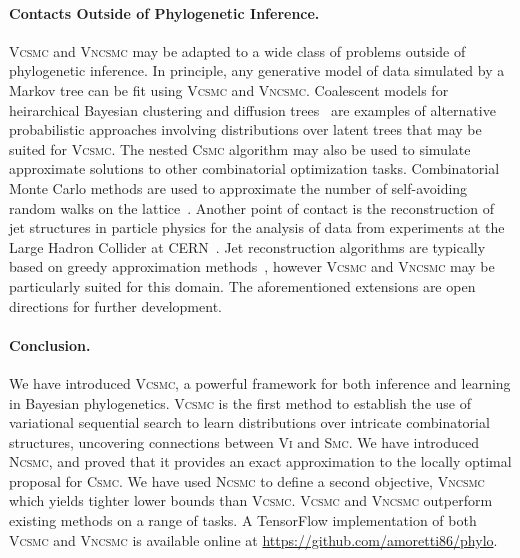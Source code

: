 \documentclass[accepted]{uai2021} %
\theoremstyle{definition}
\begin{document}
\paragraph{Contacts Outside of Phylogenetic Inference.} \textsc{Vcsmc} and \textsc{Vncsmc} may be adapted to a wide class of problems outside of phylogenetic inference. In principle, any generative model of data simulated by a Markov tree can be fit using \textsc{Vcsmc} and \textsc{Vncsmc}. Coalescent models for heirarchical Bayesian clustering and diffusion trees~\citep{teh2009bayesian,NIPS2012_c73dfe6c,10.1214/10-AOAS435} are examples of alternative probabilistic approaches involving distributions over latent trees that may be suited for \textsc{Vcsmc}. The nested \textsc{Csmc} algorithm may also be used to simulate approximate solutions to other combinatorial optimization tasks. Combinatorial Monte Carlo methods are used to approximate the number of self-avoiding random walks on the lattice~\citep{SOKAL1996172,SHIRAI2013}. Another point of contact is the reconstruction of jet structures in particle physics for the analysis of data from experiments at the Large Hadron Collider at CERN~\citep{hche2014introduction}. Jet reconstruction algorithms are typically based on greedy approximation methods~\citep{Cacciari2008,Dokshitzer1997}, however \textsc{Vcsmc} and \textsc{Vncsmc} may be particularly suited for this domain. The aforementioned extensions are open directions for further development.

\paragraph{Conclusion.} 
We have introduced \textsc{Vcsmc}, a powerful framework for both inference and learning in Bayesian phylogenetics. \textsc{Vcsmc} is the first method to establish the use of variational sequential search to learn distributions over intricate combinatorial structures, uncovering connections between \textsc{Vi} and \textsc{Smc}.
We have introduced \textsc{Ncsmc}, and proved that it provides an exact approximation to the locally optimal proposal for \textsc{Csmc}.  We have used \textsc{Ncsmc} to define a second objective, \textsc{Vncsmc} which yields tighter lower bounds than \textsc{Vcsmc}. \textsc{Vcsmc} and \textsc{Vncsmc} outperform existing methods on a range of tasks. A TensorFlow implementation of both \textsc{Vcsmc} and \textsc{Vncsmc} is available online at \url{https://github.com/amoretti86/phylo}.
\end{document}
